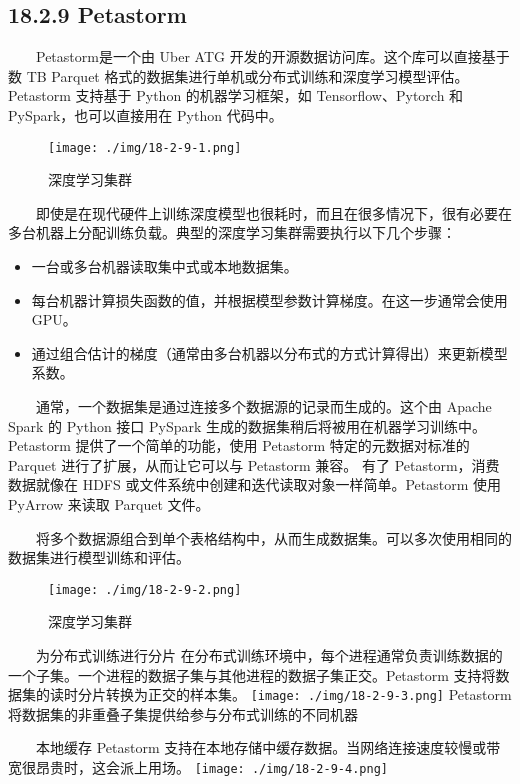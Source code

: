 \subsection{18.2.9 Petastorm}\label{petastorm}

  Petastorm是一个由 Uber ATG 开发的开源数据访问库。这个库可以直接基于数
TB Parquet 格式的数据集进行单机或分布式训练和深度学习模型评估。Petastorm
支持基于 Python 的机器学习框架，如 Tensorflow、Pytorch 和
PySpark，也可以直接用在 Python 代码中。

\begin{figure}
\centering
\texttt{[image: ./img/18-2-9-1.png]}
\caption{深度学习集群}
\end{figure}

  即使是在现代硬件上训练深度模型也很耗时，而且在很多情况下，很有必要在多台机器上分配训练负载。典型的深度学习集群需要执行以下几个步骤：

\begin{itemize}
\item
  一台或多台机器读取集中式或本地数据集。
\item
  每台机器计算损失函数的值，并根据模型参数计算梯度。在这一步通常会使用
  GPU。
\item
  通过组合估计的梯度（通常由多台机器以分布式的方式计算得出）来更新模型系数。
\end{itemize}

  通常，一个数据集是通过连接多个数据源的记录而生成的。这个由 Apache
Spark 的 Python 接口 PySpark
生成的数据集稍后将被用在机器学习训练中。Petastorm
提供了一个简单的功能，使用 Petastorm 特定的元数据对标准的 Parquet
进行了扩展，从而让它可以与 Petastorm 兼容。 有了
Petastorm，消费数据就像在 HDFS
或文件系统中创建和迭代读取对象一样简单。Petastorm 使用 PyArrow 来读取
Parquet 文件。

  将多个数据源组合到单个表格结构中，从而生成数据集。可以多次使用相同的数据集进行模型训练和评估。

\begin{figure}
\centering
\texttt{[image: ./img/18-2-9-2.png]}
\caption{深度学习集群}
\end{figure}

  为分布式训练进行分片
在分布式训练环境中，每个进程通常负责训练数据的一个子集。一个进程的数据子集与其他进程的数据子集正交。Petastorm
支持将数据集的读时分片转换为正交的样本集。
\texttt{[image: ./img/18-2-9-3.png]} Petastorm
将数据集的非重叠子集提供给参与分布式训练的不同机器

  本地缓存 Petastorm
支持在本地存储中缓存数据。当网络连接速度较慢或带宽很昂贵时，这会派上用场。
\texttt{[image: ./img/18-2-9-4.png]}

